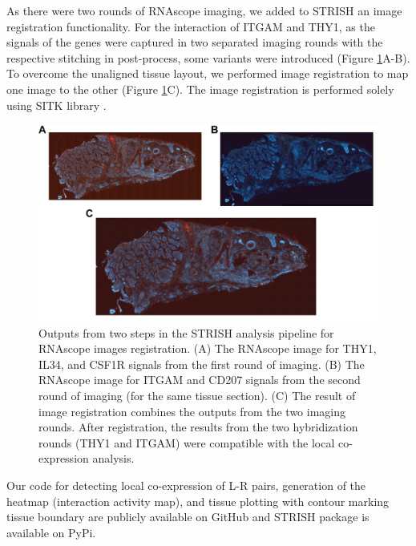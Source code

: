 As there were two rounds of RNAscope imaging, we added to STRISH an image registration functionality. For the interaction of ITGAM and THY1, as the signals of the genes were captured in two separated imaging rounds with the respective stitching in post-process, some variants were introduced (Figure \ref{fig:Chap2_Supfigure7}A-B). To overcome the unaligned tissue layout, we performed image registration to map one image to the other (Figure \ref{fig:Chap2_Supfigure7}C). The image registration is performed solely using SITK library \cite{lowekamp2013design, yaniv2018simpleitk}.  

\begin{figure}[ht]
\renewcommand{\figurename}{Figure}
    \centering
    \includegraphics[width=0.75\columnwidth]{Chapter2/Figures/Supplemental_Fig_S7.png}
    \caption[Outputs from two steps in the STRISH analysis pipeline for RNAscope images registration.]{Outputs from two steps in the STRISH analysis pipeline for RNAscope images registration. (A) The RNAscope image for THY1, IL34, and CSF1R signals from the first round of imaging. (B) The RNAscope image for ITGAM and CD207 signals from the second round of imaging (for the same tissue section). (C) The result of image registration combines the outputs from the two imaging rounds. After registration, the results from the two hybridization rounds (\ie THY1 and ITGAM) were compatible with the local co-expression analysis.}
    \label{fig:Chap2_Supfigure7}
\end{figure}

Our code for detecting local co-expression of L-R pairs, generation of the heatmap (interaction activity map), and tissue plotting with contour marking tissue boundary are publicly available on GitHub and STRISH package is available on PyPi. 

